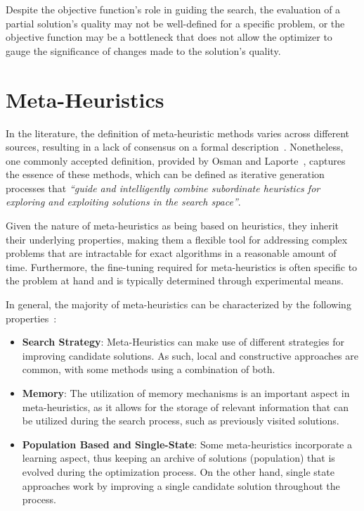 Despite the objective function's role in guiding the search, the evaluation of a
partial solution's quality may not be well-defined for a specific problem, or
the objective function may be a bottleneck that does not allow the optimizer to
gauge the significance of changes made to the solution's quality.

\section{Meta-Heuristics}
\label{section:meta-heuristics}

In the literature, the definition of meta-heuristic methods varies across
different sources, resulting in a lack of consensus on a formal
description~\cite{osman1996metaheuristics,blummetaheuristics,festa2014brief,luke2013essentialsa}.
Nonetheless, one commonly accepted definition, provided by Osman and
Laporte~\cite{osman1996metaheuristics}, captures the essence of these methods,
which can be defined as iterative generation processes that \textit{``guide and
    intelligently combine subordinate heuristics for exploring and exploiting
    solutions in the search space''}.

Given the nature of meta-heuristics as being based on heuristics, they inherit
their underlying properties, making them a flexible tool for addressing complex
problems that are intractable for exact algorithms in a reasonable amount of
time. Furthermore, the fine-tuning required for meta-heuristics is often
specific to the problem at hand and is typically determined through experimental
means.

In general, the majority of meta-heuristics can be characterized by the following
properties~\cite{blummetaheuristics}:
\begin{itemize}
    \item \textbf{Search Strategy}: Meta-Heuristics can make use of different
          strategies for improving candidate solutions. As such, local and
          constructive approaches are common, with some methods using a combination of
          both.

    \item \textbf{Memory}: The utilization of memory mechanisms is an important
          aspect in meta-heuristics, as it allows for the storage of relevant
          information that can be utilized during the search process, such as
          previously visited solutions.

    \item \textbf{Population Based and Single-State}: Some meta-heuristics
          incorporate a learning aspect, thus keeping an archive of solutions
          (population) that is evolved during the optimization process. On the other
          hand, single state approaches work by improving a single candidate solution
          throughout the process.
\end{itemize}

